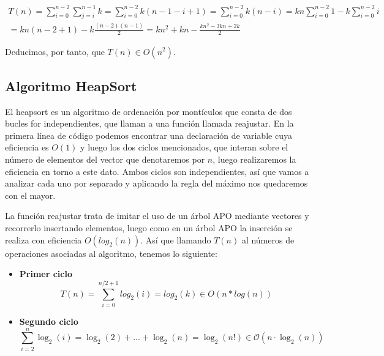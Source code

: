 \documentclass{homework}
\begin{document}
    \begin{equation*}
        \begin{split}
            T(n) = \sum_{i=0}^{n-2} \sum_{j=i}^{n-1} k = \sum_{i=0}^{n-2} k(n-1-i+1) = \sum_{i=0}^{n-2} k(n-i) = kn \sum_{i=0}^{n-2} 1  - k \sum_{i=0}^{n-2} i \\
            = kn(n-2+1) - k \frac{(n-2)(n-1)}{2} = kn^2 + kn - \frac{kn^2 - 3kn + 2k}{2}
        \end{split}
    \end{equation*}
    
    Deducimos, por tanto, que $T(n) \in O(n^2)$. 
    
    \subsection{Algoritmo HeapSort}
    
     

    El heapsort es un algoritmo de ordenación por montículos que consta de dos bucles for independientes, que llaman a una función llamada reajustar.
    En la primera línea de código podemos encontrar una declaración de variable cuya eficiencia es $O(1)$ y luego los dos ciclos mencionados, que interan 
    sobre el número de elementos del vector que denotaremos por $n$, luego realizaremos la eficiencia en torno a este dato. Ambos ciclos son independientes, 
    así que vamos a analizar cada uno por separado y aplicando la regla del máximo nos quedaremos con el mayor.
    
    La función reajustar trata de imitar el uso de un árbol APO mediante vectores y recorrerlo insertando elementos, luego como en un árbol APO la inserción se 
    realiza con eficiencia $O(log_2(n))$. Así que llamando $T(n)$ al números de operaciones asociadas al algoritmo, tenemos lo siguiente:
    
    \begin{itemize}
        \item \textbf{Primer ciclo}
        \begin{equation*}
            T(n) = \sum_{i=0}^{n/2 + 1} log_2(i) = log_2(k) \in O(n*log(n))
        \end{equation*} 

        \item \textbf{Segundo ciclo}
        \begin{equation*}
            \sum_{i=2}^{n} \log_2(i) = \log_2(2) + ... + \log_2(n) = \log_2(n!) \in \mathcal{O}(n·\log_2(n))
        \end{equation*}
        
    \end{itemize}
\end{document}

